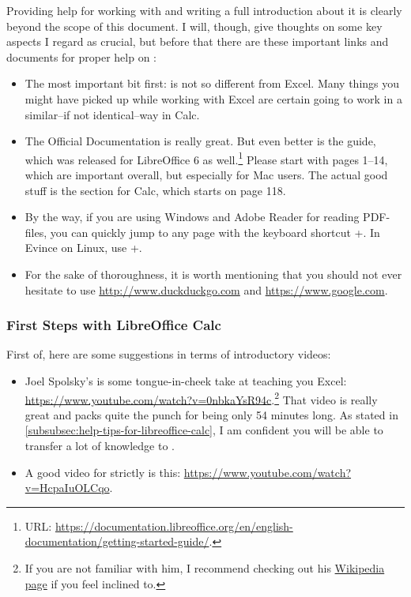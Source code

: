 Providing help for working with \loc and writing a full introduction about it is clearly beyond the scope of this document.
I will, though, give thoughts on some key aspects I regard as crucial, but before that there are these important links and documents for proper help on \loc:
\begin{itemize}
	\item The most important bit first: \loc is not so different from Excel.
	Many things you might have picked up while working with Excel are certain going to work in a similar--if not identical--way in Calc.
	\item The Official Documentation is really great.
	But even better is the  guide, which was released for LibreOffice 6 as well.\footnote{URL: \href{https://documentation.libreoffice.org/en/english-documentation/getting-started-guide/}{https://documentation.libreoffice.org/en/english-documentation/getting-started-guide/}.}
	Please start with pages 1--14, which are important overall, but especially for Mac users.
	The actual good stuff is the section for Calc, which starts on page 118.
	\item By the way, if you are using Windows and Adobe Reader for reading PDF-files, you can quickly jump to any page with the keyboard shortcut +.
	In Evince on Linux, use +.
	\item For the sake of thoroughness, it is worth mentioning that you should  not ever hesitate to use \href{http://www.duckduckgo.com}{http://www.duckduckgo.com} and  \href{https://www.google.com}{https://www.google.com}.
\end{itemize}

\subsubsection{First Steps with LibreOffice Calc}
\label{subsubsec:first-steps-with-libreoffice-calc}

First of, here are some suggestions in terms of introductory videos:
\begin{itemize}
	\item Joel Spolsky's  is some tongue-in-cheek take at teaching you Excel: \url{https://www.youtube.com/watch?v=0nbkaYsR94c}.\footnote{If you are not familiar with him, I recommend checking out his \href{https://en.wikipedia.org/wiki/Joel_Spolsky}{Wikipedia page} if you feel inclined to.}
	That video is really great and packs quite the punch for being only 54 minutes long.
	As stated in \autoref{subsubsec:help-tips-for-libreoffice-calc}, I am confident you will be able to transfer a lot of knowledge to \loc.
	\item A good video for strictly \loc is this: \url{https://www.youtube.com/watch?v=HcpaIuOLCqo}.
\end{itemize}

